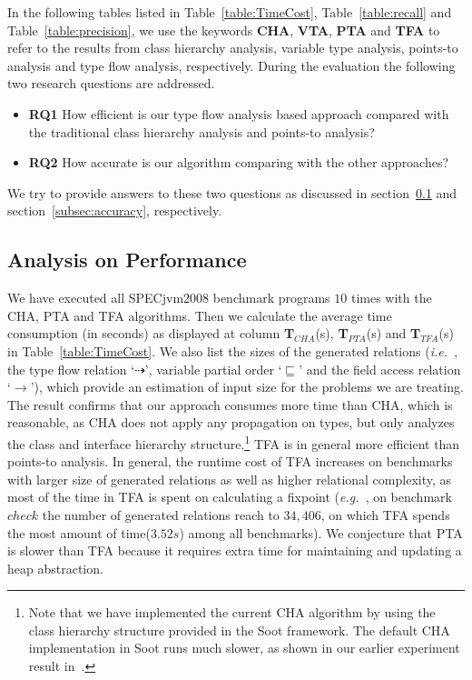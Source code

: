 \documentclass{fac}
\newcommand\eg{\textit{e.g.\ }}
\newcommand\ie{\textit{i.e.\ }}
\newcommand{\less}{\sqsubseteq}
\newcommand{\tflow}{\dashrightarrow}
\newcommand{\hflow}{\longrightarrow}
\begin{document}
In the following tables listed in Table~\ref{table:TimeCost}, Table~\ref{table:recall} and Table~\ref{table:precision}, we use the keywords \textbf{CHA}, \textbf{VTA}, \textbf{PTA} and \textbf{TFA} to refer to the results from class hierarchy analysis, variable type analysis, points-to analysis and type flow analysis, respectively. During the evaluation the following two research questions are addressed. %
\begin{itemize}
\item \textbf{RQ1} How efficient is our type flow analysis based approach compared with the traditional class hierarchy analysis and points-to analysis?
\item \textbf{RQ2} How accurate is our algorithm comparing with the other approaches?
\end{itemize}
We try to provide answers to these two questions as discussed in section~\ref{subsec:efficiency} and section~\ref{subsec:accuracy}, respectively.

\subsection{Analysis on Performance}\label{subsec:efficiency}

We have executed all SPECjvm2008 benchmark programs $10$ times with the CHA, PTA and TFA algorithms. Then we calculate the average time consumption (in seconds) as displayed at column \textbf{T$_{CHA}$}(s), \textbf{T$_{PTA}$}(s) and \textbf{T$_{TFA}$}(s) in Table~\ref{table:TimeCost}. We also list the sizes of the generated relations (\ie, the type flow relation `$\tflow$', variable partial order `$\less$' and the field access relation `$\hflow$'), which provide an estimation of input size for the problems we are treating. The result confirms that our approach consumes more time than CHA, which is reasonable, as CHA does not apply any propagation on types, but only analyzes the class and interface hierarchy structure.\footnote{Note that we have implemented the current CHA algorithm by using the class hierarchy structure provided in the Soot framework. The default CHA implementation in Soot runs much slower, as shown in our earlier experiment result in~\cite{ZhuoZ19}.} TFA is in general more efficient than points-to analysis. In general, the runtime cost of TFA increases on benchmarks with larger size of generated relations as well as higher relational complexity, as most of the time in TFA is spent on calculating a fixpoint (\eg, on benchmark $check$ the number of generated relations reach to $34,406$, on which TFA spends the most amount of time($3.52s$) among all benchmarks). We conjecture that PTA is slower than TFA because it requires extra time for maintaining and updating a heap abstraction.
\end{document}
